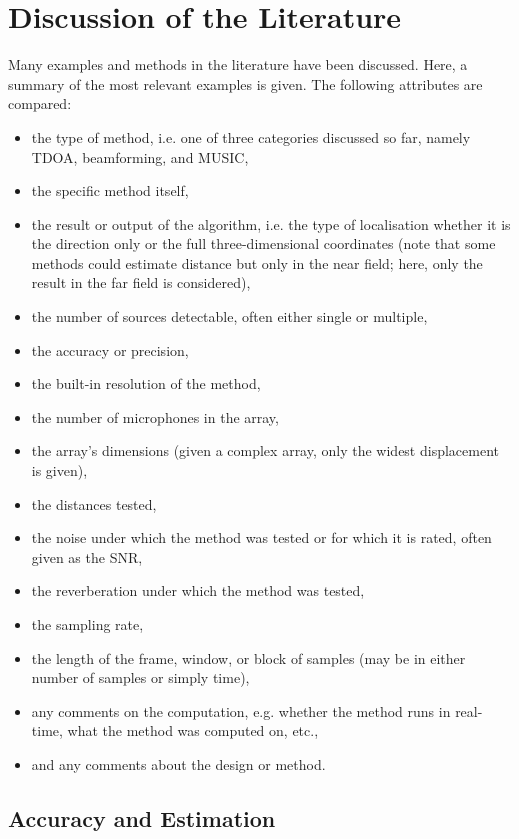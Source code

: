 \documentclass{report}
\begin{document}
\section{Discussion of the Literature}

Many examples and methods in the literature have been discussed. Here, a summary of the most relevant examples is given. The following attributes are compared:
\begin{itemize}
	\item the type of method, i.e. one of three categories discussed so far, namely TDOA, beamforming, and MUSIC,
	\item the specific method itself,
	\item the result or output of the algorithm, i.e. the type of localisation whether it is the direction only or the full three-dimensional coordinates (note that some methods could estimate distance but only in the near field; here, only the result in the far field is considered),
	\item the number of sources detectable, often either single or multiple,
	\item the accuracy or precision,
	\item the built-in resolution of the method,
	\item the number of microphones in the array,
	\item the array's dimensions (given a complex array, only the widest displacement is given),
	\item the distances tested,
	\item the noise under which the method was tested or for which it is rated, often given as the SNR,
	\item the reverberation under which the method was tested,
	\item the sampling rate,
	\item the length of the frame, window, or block of samples (may be in either number of samples or simply time),
	\item any comments on the computation, e.g. whether the method runs in real-time, what the method was computed on, etc.,
	\item and any comments about the design or method.
\end{itemize}

\subsection{Accuracy and Estimation}
\end{document}
